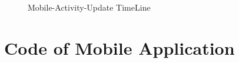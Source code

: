 \documentclass[12pt,a4paper,class,twoside,openany]{report}
\begin{document}
{\begin{figure}
\begin{center}
\caption{Mobile-Activity-Update TimeLine}
\label{fg:5-2}
\end{center}
\end{figure}
\section{Code of Mobile Application}
}
\end{document}
